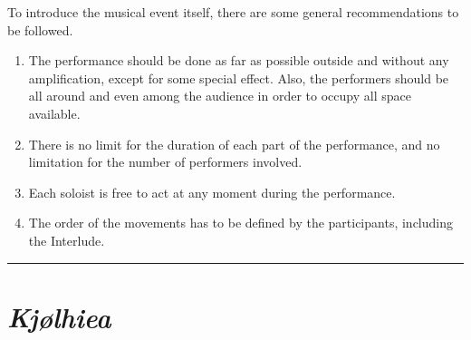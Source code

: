 \begin{description}
To introduce the musical event itself, there are some general recommendations to be followed.
\begin{enumerate}
\item The performance should be done as far as possible outside and without any amplification, except for some special effect. Also, the performers should be all around and even among the audience in order to occupy all space available.
\item There is no limit for the duration of each part of the performance, and no limitation for the number of performers involved.
\item Each soloist is free to act at any moment during the performance.
\item The order of the movements has to be defined by the participants, including the Interlude.
 \end{enumerate}
\end{description}

\bigskip
\begin{center}\rule{0.5\linewidth}{0.5pt}\end{center}
\bigskip

\section*{\textsl{Kjølhiea}}


\bigskip

